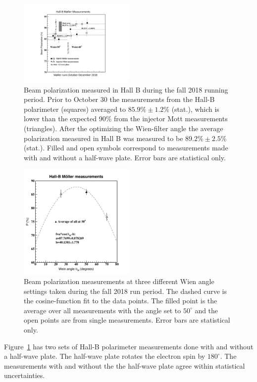 \begin{figure}[ht]
\begin{center}
\includegraphics[width=0.5\textwidth]{Moller-RGA-2018.pdf}
	\caption{Beam polarization measured in Hall B during the fall 2018 running period. Prior to October 30 the measurements from the 
	Hall-B polarimeter (squares) averaged to $85.9\%\pm1.2\%$ (stat.), which is lower than the expected 90\% from the injector Mott 
	measurements (triangles). After the optimizing the Wien-filter angle the average polarization measured in Hall B was measured 
	to be $89.2\%\pm2.5\%$ (stat.). Filled and open symbols correspond to measurements made with and without a half-wave plate. Error bars
	are statistical only.}
\label{fig:molrga}
\end{center}
\end{figure}

\begin{figure}[ht]
\begin{center}
\includegraphics[width=0.5\textwidth]{Hall-B_fall_spin_dance.pdf}
	\caption{Beam polarization measurements at three different Wien angle settings taken during the fall 2018 run period.  The dashed 
	curve is the cosine-function fit to the data points. The filled point is the average over all measurements with the angle set to $50^\circ$ 
	and the open points are from single measurements. Error bars are statistical only. }
\label{fig:sdance}
\end{center}
\end{figure}

Figure~\ref{fig:molrga} has two sets of Hall-B polarimeter measurements done with and without a half-wave plate. The half-wave
plate rotates the electron spin by $180^\circ$. The measurements with and without the the half-wave plate agree within statistical
uncertainties. 

